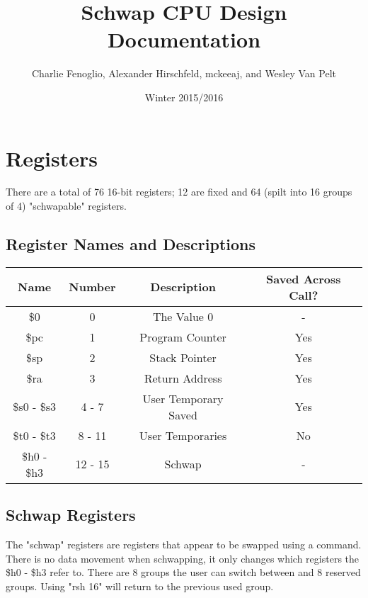 \documentclass{article}
\title{Schwap CPU Design Documentation}
\author{Charlie Fenoglio, Alexander Hirschfeld, mckeeaj, and Wesley Van Pelt}
\date{Winter 2015/2016}
\begin{document}
\maketitle
\section{Registers}
	There are a total of 76 16-bit registers; 12 are fixed and 64 (spilt into 16 groups of 4) "schwapable" registers.

	\subsection{Register Names and Descriptions}
		\begin{center}
			\begin{tabular}{| c | c | c | c |}
				\hline
				    Name        & Number  & Description      & Saved Across Call? \\ \hline
				    \$0         & 0       & The Value 0      & -   \\ \hline
				    \$pc        & 1       & Program Counter  & Yes \\ \hline
				    \$sp        & 2       & Stack Pointer    & Yes \\ \hline
				    \$ra        & 3       & Return Address   & Yes \\ \hline
				    \$s0 - \$s3 & 4 - 7   & User Temporary Saved & Yes \\ \hline
				    \$t0 - \$t3 & 8 - 11  & User Temporaries & No  \\ \hline
				    \$h0 - \$h3 & 12 - 15 & Schwap           & -   \\
				\hline
			\end{tabular}
		\end{center}
	\subsection{Schwap Registers}
		The "schwap" registers are registers that appear to be swapped using a command.  There is no data movement when schwapping, it only changes which registers the \$h0 - \$h3 refer to.  There are 8 groups the user can switch between and 8 reserved groups.  Using "rsh 16" will return to the previous used group. 
\end{document}

